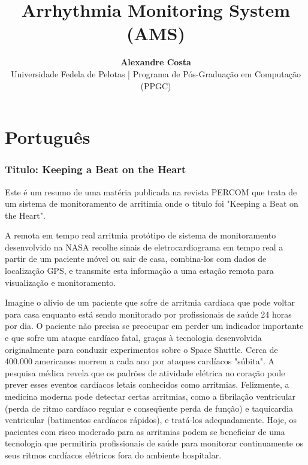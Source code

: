 \documentclass[a4paper,12pt]{article}
\title{\Large{\textbf{Arrhythmia Monitoring System (AMS)}}}
\author{\textbf{Alexandre Costa}\\
\normalsize{Universidade Fedela de Pelotas | Programa de Pós-Graduação em Computação (PPGC)}}
\date{\null}
\begin{document}
\maketitle
\thispagestyle{empty}

\part{Português}
\section{Titulo: Keeping a Beat on the Heart}

Este é um resumo de uma matéria publicada na revista PERCOM que trata de um sistema de monitoramento de arritimia onde o titulo foi "Keeping a Beat on the Heart".

A remota em tempo real arritmia protótipo de sistema de monitoramento desenvolvido na NASA recolhe sinais de eletrocardiograma em tempo real a partir de um paciente móvel ou sair de casa, combina-los com dados de localização GPS, e transmite esta informação a uma estação remota para visualização e monitoramento.

Imagine o alívio de um paciente que sofre de arritmia cardíaca que pode voltar para casa enquanto está sendo monitorado por profissionais de saúde 24 horas por dia. O paciente não precisa se ​​preocupar em perder um indicador importante e que sofre um ataque cardíaco fatal, graças à tecnologia desenvolvida originalmente para conduzir experimentos sobre o Space Shuttle. Cerca de 400.000 americanos morrem a cada ano por ataques cardíacos "súbita". A pesquisa médica revela que os padrões de atividade elétrica no coração pode prever esses eventos cardíacos letais conhecidos como arritmias. Felizmente, a medicina moderna pode detectar certas arritmias, como a fibrilação ventricular (perda de ritmo cardíaco regular e conseqüente perda de função) e taquicardia ventricular (batimentos cardíacos rápidos), e tratá-los adequadamente. Hoje, os pacientes com risco moderado para as arritmias podem se beneficiar de uma tecnologia que permitiria profissionais de saúde para monitorar continuamente os seus ritmos cardíacos elétricos fora do ambiente hospitalar.
\end{document}

